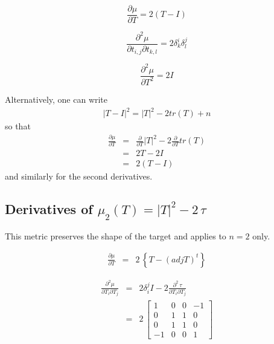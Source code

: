 \documentclass{report}
\begin{document}
\begin{equation}
\frac{\partial \mu}{\partial T} = 2(T - I)
\end{equation}


\begin{equation}
\frac{\partial^2 \mu}{\partial t_{i,j} \partial t_{k,l}} = 2 \delta^i_k \delta^j_l \end{equation}

\begin{equation}
\frac{\partial^2 \mu}{\partial T^2} = 2 I
\end{equation}

\noindent Alternatively, one can write
\begin{eqnarray}
|T-I|^2 = |T|^2 - 2 tr(T) + n
\end{eqnarray}
so that 
\begin{eqnarray}
\frac{\partial \mu}{\partial T} & = & \frac{\partial}{\partial T} |T|^2 - 2 \frac{\partial}{\partial T} tr(T) \nonumber \\
 & = & 2 T - 2 I \nonumber \\
 & = & 2 (T-I)
\end{eqnarray}
and similarly for the second derivatives. \newline

\subsection{Derivatives of $\mu_2(T)=|T|^2 - 2 \, \tau$ \label{2ds}}

This metric preserves the shape of the target and applies to $n=2$ only. \newline

\begin{eqnarray}
\frac{\partial \mu}{\partial T} & = & 2 \, \left\{ T- (adj T)^t \right\}
\end{eqnarray}

\begin{eqnarray}
\frac{\partial^2 \mu}{\partial T_i \partial T_j} & = & 2 \delta_i^j I - 2 \frac{\partial^2 \, \tau}{\partial T_i \partial T_j} \nonumber \\
 & = & 2 \, \left[ \begin{array}{cccc}
1 & 0 & 0 & -1 \\
0 & 1 & 1 & 0 \\
0 & 1 & 1 & 0 \\
-1 & 0 & 0 & 1 
\end{array} \right]
\end{eqnarray}
\end{document}
